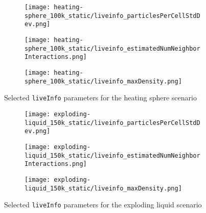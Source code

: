 \documentclass[]{article}
\begin{document}
\begin{figure}[htpb]
	\begin{center}
		\begin{subfigure}[t]{0.3\textwidth}
			\texttt{[image: heating-sphere\_100k\_static/liveinfo\_particlesPerCellStdDev.png]}
		\end{subfigure}
		\begin{subfigure}[t]{0.3\textwidth}
			\texttt{[image: heating-sphere\_100k\_static/liveinfo\_estimatedNumNeighborInteractions.png]}
		\end{subfigure}
		\begin{subfigure}[t]{0.3\textwidth}
			\texttt{[image: heating-sphere\_100k\_static/liveinfo\_maxDensity.png]}
		\end{subfigure}
	\end{center}
	\label{fig_hs_liveinfo}
	\caption{Selected \texttt{liveInfo} parameters for the heating sphere scenario}
\end{figure}


\begin{figure}[htpb]
	\begin{center}
		\begin{subfigure}[t]{0.3\textwidth}
			\texttt{[image: exploding-liquid\_150k\_static/liveinfo\_particlesPerCellStdDev.png]}
		\end{subfigure}
		\begin{subfigure}[t]{0.3\textwidth}
			\texttt{[image: exploding-liquid\_150k\_static/liveinfo\_estimatedNumNeighborInteractions.png]}
		\end{subfigure}
		\begin{subfigure}[t]{0.3\textwidth}
			\texttt{[image: exploding-liquid\_150k\_static/liveinfo\_maxDensity.png]}
		\end{subfigure}
	\end{center}
	\label{fig_expl_liveinfo}
	\caption{Selected \texttt{liveInfo} parameters for the exploding liquid scenario}
\end{figure}


\end{document}
